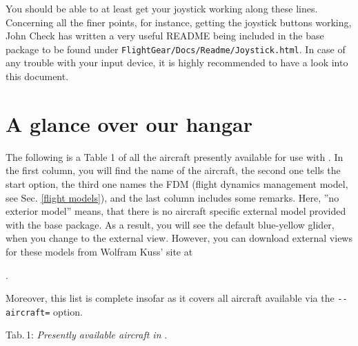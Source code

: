 You should be able to at least get your joystick working along
these lines. Concerning all the finer points, for instance, getting the joystick buttons
working, John Check has written a very useful README being included in the base package to be found under \texttt{FlightGear/Docs/Readme/Joystick.html}. In case of any trouble with your input device, it is highly recommended to have a look into this document.

\section{A glance over our hangar}\label{hangar}
The following is a Table 1 of all the aircraft presently available for use with \FlightGear{}. In the first column, you will find the name of the aircraft, the second one tells the start option, the third one names the FDM (flight dynamics management model, see Sec. \ref{flight models}), and the last column includes some remarks. Here, ''no exterior model'' means, that there is no aircraft specific external model provided with the base package. As a result, you will see the default blue-yellow glider, when you change to the external view. However, you can download external views for these models from Wolfram Kuss' site at

.

Moreover, this list is complete insofar as it covers all aircraft available via the \texttt{-$ $-aircraft=} option. 
\eject

\noindent
 Tab.\,1: \textit{Presently available aircraft in \FlightGear{}}.
 \medskip
 
\noindent
{\scriptsize

}

